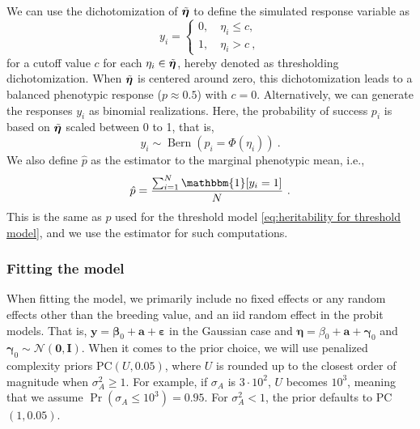 We can use the dichotomization of $\Tilde{\bm\eta}$ to define the simulated response variable as
\begin{equation}
y_i = \begin{cases}
0, \quad \eta_i\le c,\\
1, \quad \eta_i > c \ ,
\end{cases}
\label{eq:dichotomize round}
\end{equation}
for a cutoff value $c$ for each $\eta_i \in \Tilde{\bm \eta}$, hereby denoted as thresholding dichotomization. When $\Tilde{\bm \eta}$ is centered around zero, this dichotomization leads to a balanced phenotypic response ($p\approx 0.5$) with $c=0$. Alternatively, we can generate the responses $y_i$ as binomial realizations. Here, the probability of success $p_i$ is based on $\Tilde{\bm \eta}$ scaled between 0 to 1, that is,
\begin{equation}
     y_i \sim \operatorname{Bern}(p_i=\Phi(\eta_i)) \ .
     \label{eq:dichotomize binom}
\end{equation}
We also define $\hat p$ as the estimator to the marginal phenotypic mean, i.e., 
\begin{equation}
    \hat p = \frac{\sum_{i=1}^N\mathbbm{1}[y_i=1]}{N} \ .
\end{equation}
This is the same as $p$ used for the threshold model \eqref{eq:heritability for threshold model}, and we use the estimator for such computations.

\subsubsection{Fitting the model}
When fitting the model, we primarily include no fixed effects or any random effects other than the breeding value, and an iid random effect in the probit models. That is, $\bm y = \bm \beta_0 + \bm a + \bm\varepsilon$ in the Gaussian case and $\bm\eta = \beta_0+\bm a + \bm \gamma_0$ and $\bm\gamma_0\sim\mathcal N(\bm 0, \bm I)$. When it comes to the prior choice, we will use penalized complexity priors PC$(U, 0.05)$, where $U$ is rounded up to the closest order of magnitude when $\sigma^2_A \ge 1$. For example, if $\sigma_A$ is $3\cdot 10^2$, $U$ becomes $10^3$, meaning that we assume $\operatorname{Pr}(\sigma_A \le 10^3) = 0.95$. For $\sigma^2_A < 1$, the prior defaults to PC$(1,0.05)$. 


